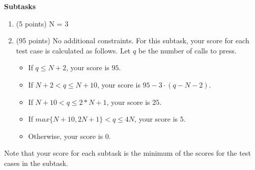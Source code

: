 \bf{Subtasks}
\begin{enumerate}
\item (5 points) N = 3

\item (95 points) No additional constraints. For this subtask, your score for each test case is calculated as follows. Let $q$ be the number of calls to press.

\begin{itemize}
\item If $q \le N+2$, your score is $95$.
\item If $N+2 < q \le N+10$, your score is $95 - 3 \cdot (q - N-2)$.
\item If $N+10 < q \le 2* N+1$, your score is $25$.
\item If $max\{N+10, 2N+1\} < q \le 4N$, your score is $5$.
\item Otherwise, your score is $0$.
\end{itemize}
\end{enumerate}
Note that your score for each subtask is the minimum of the scores for the test cases in the subtask.